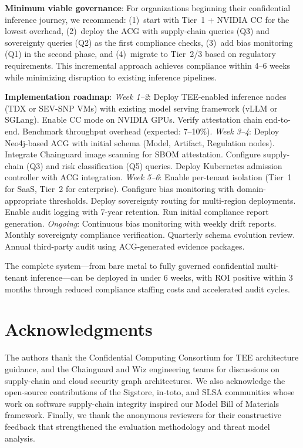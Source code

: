 \documentclass[conference,10pt]{IEEEtran}
\begin{document}
\textbf{Minimum viable governance}: For organizations beginning their confidential inference journey, we recommend: (1)~start with Tier~1 + NVIDIA CC for the lowest overhead, (2)~deploy the ACG with supply-chain queries (Q3) and sovereignty queries (Q2) as the first compliance checks, (3)~add bias monitoring (Q1) in the second phase, and (4)~migrate to Tier~2/3 based on regulatory requirements. This incremental approach achieves compliance within 4--6 weeks while minimizing disruption to existing inference pipelines.

\textbf{Implementation roadmap}:
\emph{Week 1--2}: Deploy TEE-enabled inference nodes (TDX or SEV-SNP VMs) with existing model serving framework (vLLM or SGLang). Enable CC mode on NVIDIA GPUs. Verify attestation chain end-to-end. Benchmark throughput overhead (expected: 7--10\%).
\emph{Week 3--4}: Deploy Neo4j-based ACG with initial schema (Model, Artifact, Regulation nodes). Integrate Chainguard image scanning for SBOM attestation. Configure supply-chain (Q3) and risk classification (Q5) queries. Deploy Kubernetes admission controller with ACG integration.
\emph{Week 5--6}: Enable per-tenant isolation (Tier~1 for SaaS, Tier~2 for enterprise). Configure bias monitoring with domain-appropriate thresholds. Deploy sovereignty routing for multi-region deployments. Enable audit logging with 7-year retention. Run initial compliance report generation.
\emph{Ongoing}: Continuous bias monitoring with weekly drift reports. Monthly sovereignty compliance verification. Quarterly schema evolution review. Annual third-party audit using ACG-generated evidence packages.

The complete system---from bare metal to fully governed confidential multi-tenant inference---can be deployed in under 6 weeks, with ROI positive within 3 months through reduced compliance staffing costs and accelerated audit cycles.

\section*{Acknowledgments}
The authors thank the Confidential Computing Consortium for TEE architecture guidance, and the Chainguard and Wiz engineering teams for discussions on supply-chain and cloud security graph architectures. We also acknowledge the open-source contributions of the Sigstore, in-toto, and SLSA communities whose work on software supply-chain integrity inspired our Model Bill of Materials framework. Finally, we thank the anonymous reviewers for their constructive feedback that strengthened the evaluation methodology and threat model analysis.



\end{document}
